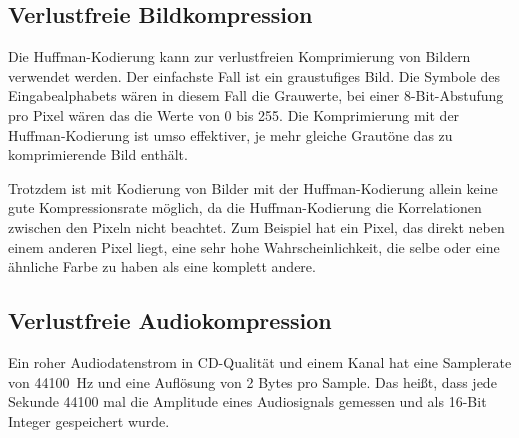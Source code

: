 \documentclass[twoside,11pt,a4paper]{article}
\theoremstyle{break}
\begin{document}
\subsection{Verlustfreie Bildkompression}
Die Huffman-Kodierung kann zur verlustfreien Komprimierung von Bildern
verwendet werden. Der einfachste Fall ist ein graustufiges Bild. Die
Symbole des Eingabealphabets wären in diesem Fall die Grauwerte, bei
einer 8-Bit-Abstufung pro Pixel wären das die Werte von 0 bis 255.
Die Komprimierung mit der Huffman-Kodierung ist umso effektiver, je
mehr gleiche Grautöne das zu komprimierende Bild enthält. \cite[S. 72
  f.]{Sayood:2006}

Trotzdem ist mit Kodierung von Bilder mit der Huffman-Kodierung allein
keine gute Kompressionsrate möglich, da die Huffman-Kodierung die
Korrelationen zwischen den Pixeln nicht beachtet. Zum Beispiel hat ein
Pixel, das direkt neben einem anderen Pixel liegt, eine sehr hohe
Wahrscheinlichkeit, die selbe oder eine ähnliche Farbe zu haben als
eine komplett andere.  \cite[S. 217 f.]{Salomon:2010}

\subsection{Verlustfreie Audiokompression}
Ein roher Audiodatenstrom in CD-Qualität und einem Kanal hat eine
Samplerate von 44100~Hz und eine Auflösung von 2 Bytes pro Sample. Das
heißt, dass jede Sekunde 44100 mal die Amplitude eines Audiosignals
gemessen und als 16-Bit Integer gespeichert wurde.

\clearpage
\renewcommand{\refname}{Literaturverzeichnis}
 
\end{document}
